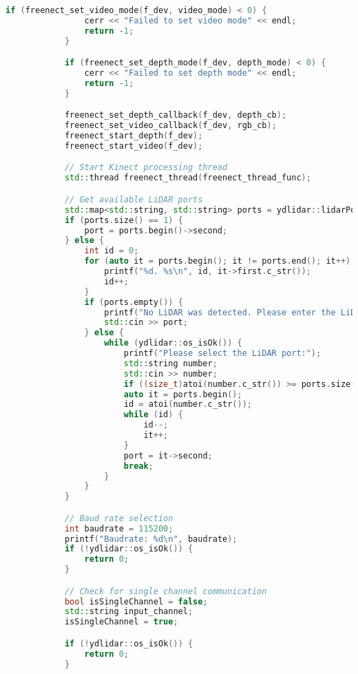 \begin{lstlisting}[language={C++}, caption={C\'odigo de ejemplo de Kinect y LiDAR}, label={Script}]
            if (freenect_set_video_mode(f_dev, video_mode) < 0) {
                cerr << "Failed to set video mode" << endl;
                return -1;
            }

            if (freenect_set_depth_mode(f_dev, depth_mode) < 0) {
                cerr << "Failed to set depth mode" << endl;
                return -1;
            }

            freenect_set_depth_callback(f_dev, depth_cb);
            freenect_set_video_callback(f_dev, rgb_cb);
            freenect_start_depth(f_dev);
            freenect_start_video(f_dev);

            // Start Kinect processing thread
            std::thread freenect_thread(freenect_thread_func);

            // Get available LiDAR ports
            std::map<std::string, std::string> ports = ydlidar::lidarPortList();
            if (ports.size() == 1) {
                port = ports.begin()->second;
            } else {
                int id = 0;
                for (auto it = ports.begin(); it != ports.end(); it++) {
                    printf("%d. %s\n", id, it->first.c_str());
                    id++;
                }
                if (ports.empty()) {
                    printf("No LiDAR was detected. Please enter the LiDAR serial port:");
                    std::cin >> port;
                } else {
                    while (ydlidar::os_isOk()) {
                        printf("Please select the LiDAR port:");
                        std::string number;
                        std::cin >> number;
                        if ((size_t)atoi(number.c_str()) >= ports.size()) continue;
                        auto it = ports.begin();
                        id = atoi(number.c_str());
                        while (id) {
                            id--;
                            it++;
                        }
                        port = it->second;
                        break;
                    }
                }
            }

            // Baud rate selection
            int baudrate = 115200;
            printf("Baudrate: %d\n", baudrate); 
            if (!ydlidar::os_isOk()) {
                return 0;
            }

            // Check for single channel communication
            bool isSingleChannel = false;
            std::string input_channel;
            isSingleChannel = true;

            if (!ydlidar::os_isOk()) {
                return 0;
            }


\end{lstlisting}
